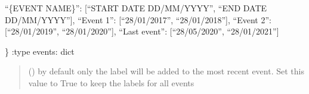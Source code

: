 \documentclass[letterpaper,10pt,english]{sphinxmanual}
\begin{document}
\begin{fulllineitems}
\begin{quote}
\begin{description}
\end{description}\end{quote}
\begin{description}
\sphinxAtStartPar
“\{EVENT NAME\}”: {[}“START DATE DD/MM/YYYY”, “END DATE DD/MM/YYYY”{]},
“Event 1”: {[}“28/01/2017”, “28/01/2018”{]},
“Event 2”: {[}“28/01/2019”, “28/01/2020”{]},
“Last event”: {[}“28/05/2020”, “28/01/2021”{]}

\end{description}

\sphinxAtStartPar
\}
:type events: dict
\begin{quote}\begin{description}
\sphinxAtStartPar
{} () \textendash{} by default only the label will be added to the most recent event. Set this value to True to keep the labels for all events

\end{description}\end{quote}

\begin{fulllineitems}
\label{\detokenize{index:sjvisualizer.LineChart.line_chart.draw}}
\pysigstartsignatures
{}
\pysigstopsignatures
\end{fulllineitems}


\begin{fulllineitems}
\label{\detokenize{index:sjvisualizer.LineChart.line_chart.update}}
\pysigstartsignatures
{}
\pysigstopsignatures
\end{fulllineitems}


\end{fulllineitems}

\label{\detokenize{index:module-sjvisualizer.Total}}
\end{document}
